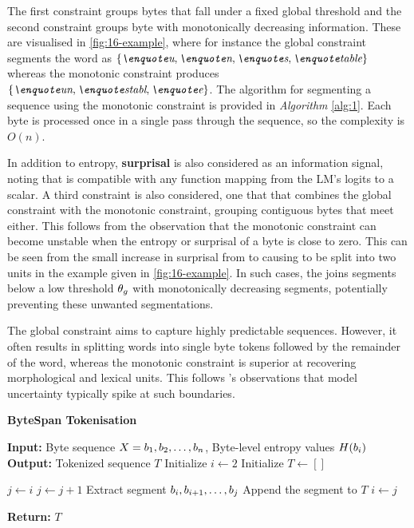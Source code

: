 The first constraint groups bytes that fall under a fixed global threshold and the second constraint groups byte with monotonically decreasing information. These are visualised in \cref{fig:16-example}, where for instance the global constraint segments the word  as $\{\ex{u}, \ex{n}, \ex{s}, \ex{table} \}$ whereas the monotonic constraint produces $\{\ex{un}, \ex{stabl}, \ex{e}\}$. The algorithm for segmenting a sequence using the monotonic constraint is provided in \emph{Algorithm} \ref{alg:1}. Each byte is processed once in a single pass through the sequence, so the complexity is \(O(n)\). 

In addition to entropy, \textbf{surprisal} is also considered as an information signal, noting that \bytespan is compatible with any function mapping from the LM's logits to a scalar. A third constraint is also considered, one that that combines the global constraint with the monotonic constraint, grouping contiguous bytes that meet either. This follows from the observation that the monotonic constraint can become unstable when the entropy or surprisal of a byte is close to zero. This can be seen from the small increase in surprisal from  to  causing  to be split into two units in the example given in \cref{fig:16-example}. In such cases, the  joins segments below a low threshold \(\theta_g \) with monotonically decreasing segments, potentially preventing these unwanted segmentations.


The global constraint aims to capture highly predictable sequences. However, it often results in splitting words into single byte tokens followed by the remainder of the word, whereas the monotonic constraint is superior at recovering morphological and lexical units. This follows \citet{elman-1990-finding}'s observations that model uncertainty typically spike at such boundaries.

\begin{algorithm}[t]
\caption{\textbf{ByteSpan Tokenisation}}
\begin{algorithmic}[1]
\STATE \textbf{Input:} Byte sequence $X = b_1, b_2, \dots, b_n$, Byte-level entropy values $H(b_i)$
\STATE \textbf{Output:} Tokenized sequence $T$
\STATE Initialize $i \gets 2$ 
\STATE Initialize $T \gets []$ 

    \STATE $j \gets i$
        \STATE $j \gets j + 1$
    \ENDWHILE
    \STATE Extract segment $b_i, b_{i+1}, \dots, b_{j}$
    \STATE Append the segment to $T$
    \STATE $i \gets j$
\ENDWHILE

\STATE \textbf{Return:} $T$
\end{algorithmic}
\label{alg:1}
\end{algorithm}

